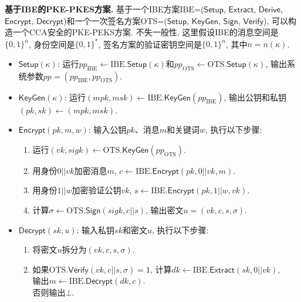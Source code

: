 
\medskip\noindent\textbf{基于IBE的PKE-PKES方案.} 基于一个IBE方案$\text{IBE}$=($\mathsf{Setup}$, $\mathsf{Extract}$, $\mathsf{Derive}$, $\mathsf{Encrypt}$, $\mathsf{Decrypt}$)和一个一次签名方案$\text{OTS}$=($\mathsf{Setup}$, $\mathsf{KeyGen}$, $\mathsf{Sign}$, $\mathsf{Verify}$), 可以构造一个CCA安全的PKE-PEKS方案. 不失一般性, 这里假设IBE的消息空间是 $\{0,1\}^n$, 身份空间是$\{0,1\}^*$, 签名方案的验证密钥空间是$\{0,1\}^n$, 其中$n = n(\kappa)$.
 
\begin{construction}\label{construction:ch6-PKE-PEKS-2}
\begin{itemize}
	\item $\mathsf{Setup}(\kappa)$: 运行$pp_{\text{IBE}} \leftarrow \text{IBE}.\mathsf{Setup}(\kappa)$和$pp_{\text{OTS}} \leftarrow \text{OTS}.\mathsf{Setup}(\kappa)$, 输出系统参数$pp = (pp_{\text{IBE}}, pp_{\text{OTS}})$.

	\item $\mathsf{KeyGen}(\kappa)$: 运行$(mpk, msk) \leftarrow \text{IBE}.\mathsf{KeyGen}(pp_{\text{IBE}})$, 输出公钥和私钥$(pk, sk) \leftarrow (mpk, msk)$.

	\item $\mathsf{Encrypt}(pk, m, w)$: 输入公钥$pk$、消息$m$和关键词$w$, 执行以下步骤:
		\begin{enumerate} \itemsep 1pt \parskip 0pt \parsep 0pt
			\item 运行$(vk, sigk) \leftarrow \text{OTS}.\mathsf{KeyGen}(pp_{\text{OTS}})$.
			\item 用身份$0||vk$加密消息$m$, $c \leftarrow \text{IBE}.\mathsf{Encrypt}(pk, 0||vk, m)$.
			\item 用身份$1||w$加密验证公钥$vk$, $s \leftarrow \text{IBE}.\mathsf{Encrypt}(pk, 1||w, vk)$.
			\item 计算$\sigma \leftarrow \text{OTS}.\mathsf{Sign}(sigk, c||s)$, 输出密文$u = (vk, c, s, \sigma)$.			
		\end{enumerate}

	\item $\mathsf{Decrypt}(sk, u)$: 输入私钥$sk$和密文$u$, 执行以下步骤:
		\begin{enumerate} \itemsep 1pt \parskip 0pt \parsep 0pt
			\item 将密文$u$拆分为$(vk, c, s, \sigma)$. 
			\item 如果$\text{OTS}.\mathsf{Verify}(vk, c||s, \sigma) = 1$, 计算$dk \leftarrow \mathrm{IBE}.\mathsf{Extract}(sk, 0||vk)$,\\
				\hspace*{2em} 输出$m \leftarrow \text{IBE}.\mathsf{Decrypt}(dk, c)$.\\
                否则输出$\bot$.
		\end{enumerate}


\end{itemize}
\end{construction}

